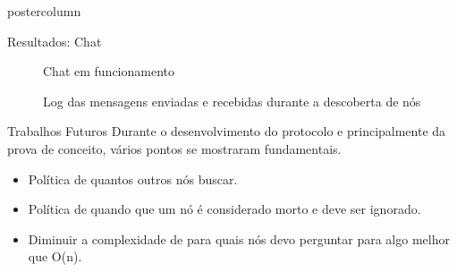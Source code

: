 \documentclass[final]{beamer}
\begin{document}
\begin{frame}
\begin{columns}
\begin{column}{.5\textwidth}
\begin{beamercolorbox}[center,wd=\textwidth]{postercolumn}
\begin{minipage}[T]{.95\textwidth}
{\begin{block}{Resultados: Chat}
                \begin{figure}[htp]
                  \centering
                  \caption{Chat em funcionamento}
                \end{figure}
                \begin{figure}[htp]
                  \centering
                  \caption{Log das mensagens enviadas e recebidas durante a descoberta de nós}
                \end{figure}
                \vspace*{0.2cm} 
            \end{block}
            
            \vspace*{0.2cm} 
            \begin{block}{Trabalhos Futuros}
                Durante o desenvolvimento do protocolo e principalmente da prova de conceito, vários pontos se mostraram fundamentais.
                                
                \begin{itemize}
                  \item Política de quantos outros nós buscar.
                  \item Política de quando que um nó é considerado morto e deve ser ignorado.
                  \item Diminuir a complexidade de para quais nós devo perguntar para algo melhor que O(n).
                \end{itemize}
                
                \vspace*{0.2cm} 
            \end{block}
            
            \vspace*{0.2cm} 
            
}
\end{minipage}
\end{beamercolorbox}
\end{column}
\end{columns}
\end{frame}
\end{document}
